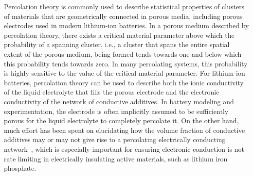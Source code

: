\documentclass[journal=jpclcd,manuscript=article]{achemso}
\begin{document}
Percolation theory \cite{essam_percolation_1980, stauffer_introduction_1994} is commonly used to describe statistical properties of clusters of materials that are geometrically connected in porous media, including porous electrodes used in modern lithium-ion batteries\cite{ferguson_nonequilibrium_2012}. In a porous medium described by percolation theory, there exists a critical material parameter above which the probability of a spanning cluster, i.e., a cluster that spans the entire spatial extent of the porous medium, being formed tends towards one and below which this probability tends towards zero.\cite{ferguson_nonequilibrium_2012} In many percolating systems, this probability is highly sensitive to the value of the critical material parameter. For lithium-ion batteries, percolation theory can be used to describe both the ionic conductivity of the liquid electrolyte that fills the porous electrode and the electronic conductivity of the network of conductive additives. In battery modeling and experimentation, the electrode is often implicitly assumed to be sufficiently porous for the liquid electrolyte to completely percolate it. On the other hand, much effort has been spent on elucidating how the volume fraction of conductive additives may or may not give rise to a percolating electrically conducting network~\cite{chen_selection_2007, li_effects_2015, cerbelaud_understanding_2015, guzman_improved_2017}, which is especially important for ensuring electronic conduction is not rate limiting in electrically insulating active materials, such as lithium iron phosphate.\cite{li_effects_2015, guzman_improved_2017}

\end{document}
